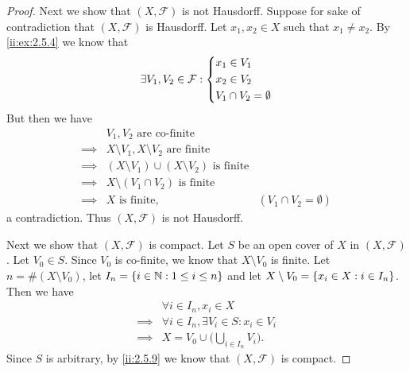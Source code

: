 \begin{proof}
  Next we show that \((X, \mathcal{F})\) is not Hausdorff.
  Suppose for sake of contradiction that \((X, \mathcal{F})\) is Hausdorff.
  Let \(x_1, x_2 \in X\) such that \(x_1 \neq x_2\).
  By \cref{ii:ex:2.5.4} we know that
  \[
    \exists V_1, V_2 \in \mathcal{F} : \begin{dcases}
      x_1 \in V_1 \\
      x_2 \in V_2 \\
      V_1 \cap V_2 = \emptyset
    \end{dcases}
  \]
  But then we have
  \begin{align*}
             & V_1, V_2 \text{ are co-finite}                                                          \\
    \implies & X \setminus V_1, X \setminus V_2 \text{ are finite}                                     \\
    \implies & (X \setminus V_1) \cup (X \setminus V_2) \text{ is finite}                              \\
    \implies & X \setminus (V_1 \cap V_2) \text{ is finite}                                            \\
    \implies & X \text{ is finite},                                       & (V_1 \cap V_2 = \emptyset)
  \end{align*}
  a contradiction.
  Thus \((X, \mathcal{F})\) is not Hausdorff.

  Next we show that \((X, \mathcal{F})\) is compact.
  Let \(S\) be an open cover of \(X\) in \((X, \mathcal{F})\).
  Let \(V_0 \in S\).
  Since \(V_0\) is co-finite, we know that \(X \setminus V_0\) is finite.
  Let \(n = \#(X \setminus V_0)\), let \(I_n = \left\lbrace i \in \mathbb{N} : 1 \leq i \leq n\right\rbrace\) and let \(X \setminus V_0 = \left\lbrace x_i \in X : i \in I_n\right\rbrace\).
  Then we have
  \begin{align*}
             & \forall i \in I_n, x_i \in X                       \\
    \implies & \forall i \in I_n, \exists V_i \in S : x_i \in V_i \\
    \implies & X = V_0 \cup \bigg(\bigcup_{i \in I_n} V_i\bigg).
  \end{align*}
  Since \(S\) is arbitrary, by \cref{ii:2.5.9} we know that \((X, \mathcal{F})\) is compact.


\end{proof}
